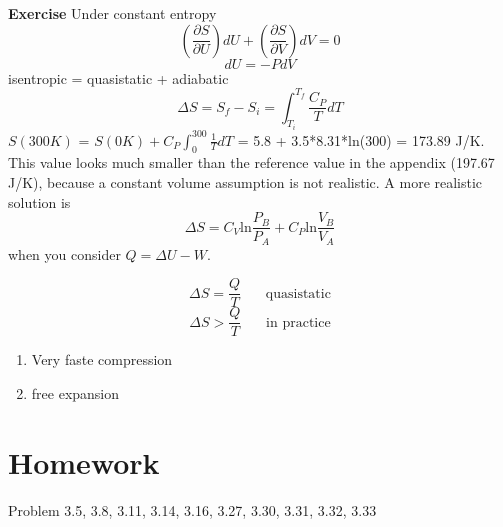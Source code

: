 {\bf Exercise}
Under constant entropy
\begin{equation} (\frac{\partial S}{\partial U})dU + (\frac{\partial S}{\partial V})dV = 0 \end{equation}
\begin{equation} dU = -PdV \end{equation}
isentropic = quasistatic + adiabatic \\
\begin{equation} \Delta{S} = S_f-S_i = \int^{T_f}_{T_i} \frac{C_P}{T} dT \end{equation}
$S(300K)$ = $S(0K) + C_P \int^{300}_{0} \frac{1}{T} dT$ = 5.8 + 3.5*8.31*ln(300) = 173.89 J/K.\\
This value looks much smaller than the reference value in the appendix (197.67 J/K), because a constant volume assumption is not realistic.
A more realistic solution is
\begin{equation} \Delta{S} = C_V\text{ln}\frac{P_B}{P_A} + C_P\text{ln}\frac{V_B}{V_A}\end{equation}
when you consider $Q = \Delta U-W$.

\begin{equation} \Delta{S} = \frac{Q}{T} ~~~~~~~~\text{quasistatic}\end{equation}
\begin{equation} \Delta{S} > \frac{Q}{T} ~~~~~~~~\text{in practice}\end{equation}

\begin{enumerate}
\item Very faste compression
\item free expansion
\end{enumerate}



\section{Homework}
Problem  3.5, 3.8, 3.11, 3.14, 3.16, 3.27, 3.30, 3.31, 3.32, 3.33


